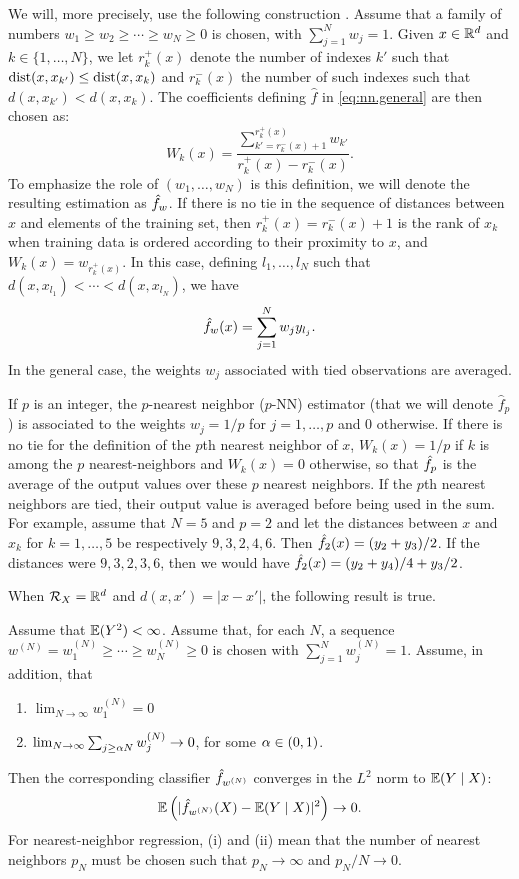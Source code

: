 We will, more precisely, use the following construction \cite{stone1977consistent}. Assume that a family of numbers $w_1 \geq w_2 \geq \cdots \geq w_N \geq 0$ is chosen, with $\sum_{j=1}^N w_j = 1$. Given $x\in {\mathbb{R}}^d$ and $k\in\{1, \ldots, N\}$, we let 
$r_k^+(x)$ denote the number of indexes $k'$ such  that $\operatorname{dist}(x,x_{k'}) \leq \operatorname{dist}(x, x_k)$ and $r_k^-(x)$ the number of such indexes such  that $d(x,x_{k'}) < d(x, x_k)$. The coefficients defining  $\hat f$ in \cref{eq:nn.general} are then chosen as:
\begin{equation}
\label{eq:wj}
W_k(x) = \frac{\sum_{k' = r^-_k(x)+1}^{r^+_k(x)} w_{k'}}{r^+_k(x) - r^-_k(x)}.
\end{equation}
To emphasize the role of $(w_1, \ldots, w_N)$ is this definition, we will denote the resulting estimation as ${\hat{f}}_w$.
If there is no tie in the sequence of distances between $x$ and elements of the training set, then $r^+_k(x) = r^-_k(x) + 1$ is the rank of $x_k$ when training data is ordered according to their proximity to $x$, and $W_k(x) = w_{r_k^+(x)}$. In this case, defining $l_1, \ldots, l_N$ such that $d(x, x_{l_1}) < \cdots < d(x, x_{l_N})$, we have
\[
{\hat{f}}_w(x) = \sum_{j=1}^N w_j y_{l_j}.
\]
In the general case, the weights $w_j$ associated with tied observations are averaged.

If $p$ is an integer,  the $p$-nearest neighbor ($p$-NN) estimator (that we will denote $\hat f_p$) is associated to the weights $w_j = 1/p$ for $j = 1, \ldots, p$ and 0 otherwise. If there is no tie for the definition of the $p$th nearest neighbor of $x$, $W_k(x) = 1/p$ if $k$ is among the $p$ nearest-neighbors and $W_k(x) = 0$ otherwise, so that ${\hat{f}}_p$ is the average of the output values over these $p$ nearest neighbors. If the $p$th nearest neighbors are tied, their output value is averaged before being used in the sum. For example, assume that $N = 5$ and $p=2$ and let the distances between $x$ and $x_k$ for $k=1, \ldots, 5$ be respectively $9, 3, 2, 4, 6$. Then ${\hat{f}}_2(x) = (y_2+y_3)/2$. If the distances were $9, 3, 2, 3, 6$, then we would have ${\hat{f}}_2(x) = (y_2+y_4)/4 + y_3/2$. 


When ${\mathcal R}_X = {\mathbb{R}}^d$ and  $d(x,x') = |x-x'|$, the following result is true.
\begin{theorem}
\label{th:stone}
Assume that
$\bm{\mathbb E}(Y^2) < \infty$. Assume that, for each $N$, a sequence $w^{(N)} = w^{(N)}_1 \geq  \cdots \geq w^{(N)}_N \geq 0$ is chosen with $\sum_{j=1}^N w^{(N)}_j =1$. Assume, in addition, that 
\begin{enumerate}[label=(\roman*)]
\item $\lim_{N\to\infty} w^{(N)}_1 = 0 $ 
\item $\lim_{N\to\infty} \sum_{j\geq \alpha N}w_j^{(N)} \to 0$, for some $\alpha\in (0,1)$. 
\end{enumerate}
Then the corresponding classifier ${\hat{f}}_{w^{(N)}}$ converges in the $L^2$ norm to $\bm{\mathbb E}(Y\mid X)$: 
$$
\bm{\mathbb E}\left(|{\hat{f}}_{w^{(N)}}(X) - \bm{\mathbb E}(Y\mid X)|^2\right) \to 0.
$$
For nearest-neighbor regression, (i) and (ii) mean that the number of nearest neighbors $p_N$ must be chosen such that $p_N \to \infty$ and $p_N/N \to 0$.
\end{theorem}

